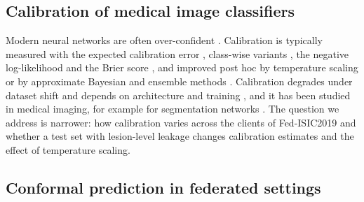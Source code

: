 \documentclass[VANCOUVER,Times1COL]{WileyNJDv5}
\begin{document}
\subsection{Calibration of medical image classifiers}

Modern neural networks are often over-confident \cite{guo2017calibration}. Calibration is typically
measured with the expected calibration error \cite{naeini2015ece}, class-wise variants
\cite{kull2019beyond}, the negative log-likelihood and the Brier score \cite{brier1950}, and improved post
hoc by temperature scaling \cite{guo2017calibration} or by approximate Bayesian and ensemble methods
\cite{gal2016dropout}. Calibration degrades under dataset shift
\cite{ovadia2019trust} and depends on architecture and training \cite{minderer2021revisiting}, and it has
been studied in medical imaging, for example for segmentation networks \cite{mehrtash2020confidence}. The question we
address is narrower: how calibration varies across the clients of Fed-ISIC2019 and whether a test set with
lesion-level leakage changes calibration estimates and the effect of temperature scaling.

\subsection{Conformal prediction in federated settings}
\end{document}
